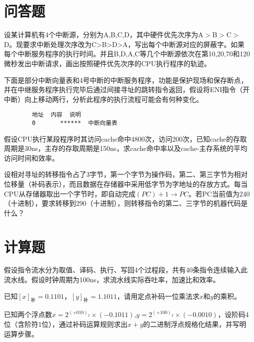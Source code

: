 \documentclass[a4paper]{exam}
\begin{document}
\section{问答题}
\begin{questions}
	\question 设某计算机有4个中断源，分别为A,B,C,D，其中硬件优先次序为A$>$B$>$C$>$D。现要求中断处理次序改为C>B>D>A，写出每个中断源对应的屏蔽字。如果每个中断服务程序的执行时间。并且B,D,A,C等几个中断源依次在第10,20,70和120微秒发出中断请求，画出按照硬件优先次序的CPU执行程序的轨迹。

	\vspace{2cm}
	\question 下面是部分中断向量表和4号中断的中断服务程序，功能是保护现场和保存断点，并在中继服务程序执行完毕后通过间接寻址的跳转指令返回，假设将ENI指令（开中断）向上移动两行，分析此程序的执行流程可能会有何种变化。

	\begin{verbatim}
		地址	内容	说明
		0       ******  中断向量表
	\end{verbatim}

	\vspace{3cm}

	\question 假设CPU执行某段程序时其访问cache命中4800次，访问200次，已知cache的存取周期是30ns，主存的存取周期是150ns，求cache命中率以及cache-主存系统的平均访问时间和效率。

	\vspace{3cm}

	\question 设相对寻址的转移指令占了3字节，第一个字节为操作码，第二、第三字节为相对位移量（补码表示），而且数据在存储器中采用低字节为字地址的存放方式。每当CPU从存储器取出一个字节时，即自动完成$\left( {PC} \right) + 1 \to PC$。若PC当前值为240（十进制），要求转移到290（十进制），则转移指令的第二、三字节的机器代码是什么？
	\vspace{4cm}
\end{questions}

\section{计算题}
\begin{questions}
	\question 假设指令流水分为取值、译码、执行、写回4个过程段，共有40条指令连续输入此流水线。假设时钟周期为100ns，求流水线实际吞吐率，加速比和效率。
	\vspace{3cm}

	\question 已知${\left[ x \right]_{\mbox{补}}}=0.1101$，${\left[ y \right]_{\mbox{补}}} =1.1011$，请用定点补码一位乘法求$x$和$y$的乘积。

	\vspace{3cm}

	\question 已知两个浮点数$x = {2^{{{( + 010)}_2}}} \times ( - 0.1011)$,$y = {2^{{{( + 100)}_2}}} \times ( - 0.0010)$，设阶码4位（含阶符1位），通过补码运算规则求出$x+y$的二进制浮点规格化结果，并写明运算步骤。

	\vspace{4cm}
\end{questions}
\end{document}
